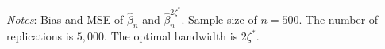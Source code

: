 \documentclass[12pt,fleqn]{article}
\theoremstyle{definition}
\newcommand{\wh}{\widehat}
\newcommand{\hROT}{\zeta^*}
\begin{document}
\begin{sidewaystable}[!htbp]
\begin{adjustbox}{scale=0.99,right}
\begin{threeparttable}
\begin{tablenotes}
\scriptsize
\item \textit{Notes}: Bias and MSE of $\wh{\beta}_{n}$ and $\wh{\beta}_{n}^{2\hROT}$. Sample size of $n=500$. The number of replications is $5,000$. The optimal bandwidth is $2\hROT$.
\end{tablenotes}
\end{threeparttable}
\end{adjustbox}
\end{sidewaystable}
\end{document}
